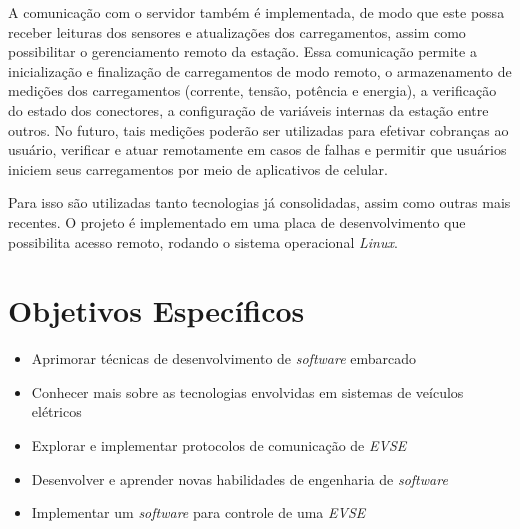     A comunicação com o servidor também é implementada, de modo que este possa receber leituras dos sensores e atualizações dos carregamentos, assim como possibilitar o gerenciamento remoto da estação. Essa comunicação permite a inicialização e finalização de carregamentos de modo remoto, o armazenamento de medições dos carregamentos (corrente, tensão, potência e energia), a verificação do estado dos conectores, a configuração de variáveis internas da estação entre outros. No futuro, tais medições poderão ser utilizadas para efetivar cobranças ao usuário, verificar e atuar remotamente em casos de falhas e permitir que usuários iniciem seus carregamentos por meio de aplicativos de celular.

    Para isso são utilizadas tanto tecnologias já consolidadas, assim como outras mais recentes. O projeto é implementado em uma placa de desenvolvimento que possibilita acesso remoto, rodando o sistema operacional \textit{Linux}.

  \section{Objetivos Específicos}
  \label{stateofart:intro:specificobjectives}

    \begin{itemize}
      \item Aprimorar técnicas de desenvolvimento de \textit{software} embarcado
      \item Conhecer mais sobre as tecnologias envolvidas em sistemas de veículos elétricos
      \item Explorar e implementar protocolos de comunicação de \textit{\ac{EVSE}}
      \item Desenvolver e aprender novas habilidades de engenharia de \textit{software}
      \item Implementar um \textit{software} para controle de uma \textit{\ac{EVSE}}
    \end{itemize}
